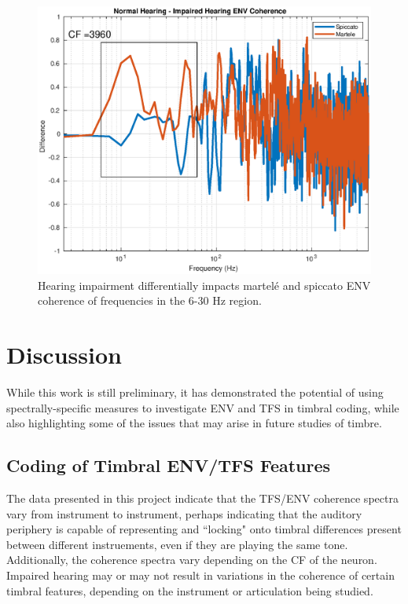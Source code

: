 \documentclass[conference]{IEEEtran}
\begin{document}
\begin{figure}[h]
\includegraphics[width = .5\textwidth]{martele_spiccato_ENV_3960}
\caption{Hearing impairment differentially impacts martel\'{e} and spiccato ENV coherence of frequencies in the 6-30 Hz region.}
\label{spic_mart_diff}
\end{figure} 

\section{Discussion}
While this work is still preliminary, it has demonstrated the potential of using spectrally-specific measures to investigate ENV and TFS in timbral coding, while also highlighting some of the issues that may arise in future studies of timbre. 

\subsection{Coding of Timbral ENV/TFS Features} 

The data presented in this project indicate that the TFS/ENV coherence spectra vary from instrument to instrument, perhaps indicating that the auditory periphery is capable of representing and ``locking" onto timbral differences present between different instruements, even if they are playing the same tone. Additionally, the coherence spectra vary depending on the CF of the neuron. Impaired hearing may or may not result in variations in the coherence of certain timbral features, depending on the instrument or articulation being studied. 
  
\end{document}
